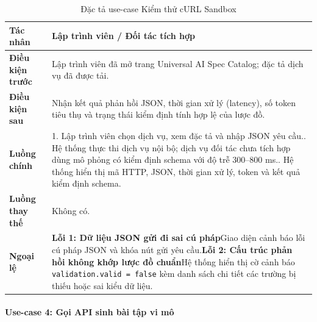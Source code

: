 \begingroup
\small
\begin{longtable}{|p{3.2cm}|p{\dimexpr\linewidth-3.2cm-4\tabcolsep-3\arrayrulewidth\relax}|}
\caption{Đặc tả use-case Kiểm thử cURL Sandbox}
\label{aihub:tab:uc_run_spec_curl}\\
\hline
\textbf{Tác nhân} & Lập trình viên / Đối tác tích hợp \\ \hline
\textbf{Điều kiện trước} & Lập trình viên đã mở trang Universal AI Spec Catalog; đặc tả dịch vụ đã được tải. \\ \hline
\textbf{Điều kiện sau} & Nhận kết quả phản hồi JSON, thời gian xử lý (latency), số token tiêu thụ và trạng thái kiểm định tính hợp lệ của lược đồ. \\ \hline
\textbf{Luồng chính} & 1. Lập trình viên chọn dịch vụ, xem đặc tả và nhập JSON yêu cầu.\newline 2. Hệ thống thực thi dịch vụ nội bộ; dịch vụ đối tác chưa tích hợp dùng mô phỏng có kiểm định schema với độ trễ 300--800 ms.\newline 3. Hệ thống hiển thị mã HTTP, JSON, thời gian xử lý, token và kết quả kiểm định schema. \\ \hline
\textbf{Luồng thay thế} & Không có. \\ \hline
\textbf{Ngoại lệ} &
\textbf{Lỗi 1: Dữ liệu JSON gửi đi sai cú pháp}\newline Giao diện cảnh báo lỗi cú pháp JSON và khóa nút gửi yêu cầu.\newline \textbf{Lỗi 2: Cấu trúc phản hồi không khớp lược đồ chuẩn}\newline Hệ thống hiển thị cờ cảnh báo \texttt{validation.valid = false} kèm danh sách chi tiết các trường bị thiếu hoặc sai kiểu dữ liệu. \\ \hline
\end{longtable}
\endgroup

\paragraph{Use-case 4: Gọi API sinh bài tập vi mô}

